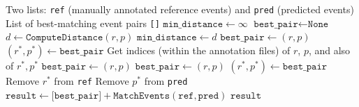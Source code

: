 \begin{ChFiveAlgorithm}[ht]
\caption{Recursive Best Match}
\scriptsize
\label{ch05:alg:recursive_match}
\begin{algorithmic}[1]
\ChFiveAlgRequire Two lists: \texttt{ref} (manually annotated reference events) and \texttt{pred} (predicted events)
\ChFiveAlgEnsure List of best-matching event pairs
        \ChFiveAlgState \ChFiveAlgReturn \texttt{[]}
    \ChFiveAlgEndIf
    \ChFiveAlgState $\texttt{min\_distance} \gets \infty$
    \ChFiveAlgState $\texttt{best\_pair} \gets \texttt{None}$
            \ChFiveAlgState $d \gets \texttt{ComputeDistance}(r, p)$
                \ChFiveAlgState $\texttt{min\_distance} \gets d$
                \ChFiveAlgState $\texttt{best\_pair} \gets (r, p)$
                \ChFiveAlgState $(r^*, p^*) \gets \texttt{best\_pair}$
                \ChFiveAlgState Get indices (within the annotation files) of $r$, $p$, and also of $r^*, p^*$
                    \ChFiveAlgState $\texttt{best\_pair} \gets (r, p)$
                    \ChFiveAlgState $\texttt{best\_pair} \gets (r, p)$
                \ChFiveAlgEndIf
            \ChFiveAlgEndIf
        \ChFiveAlgEndFor
    \ChFiveAlgEndFor
    \ChFiveAlgState $(r^*,p^*) \gets \texttt{best\_pair}$
    \ChFiveAlgState Remove $r^*$ from \texttt{ref}
    \ChFiveAlgState Remove $p^*$ from \texttt{pred}
    \ChFiveAlgState $\texttt{result} \gets \texttt{[best\_pair]} + \texttt{MatchEvents}(\texttt{ref}, \texttt{pred})$
    \ChFiveAlgState \ChFiveAlgReturn $\texttt{result}$
\ChFiveAlgEndFunction
\end{algorithmic}
\end{ChFiveAlgorithm}